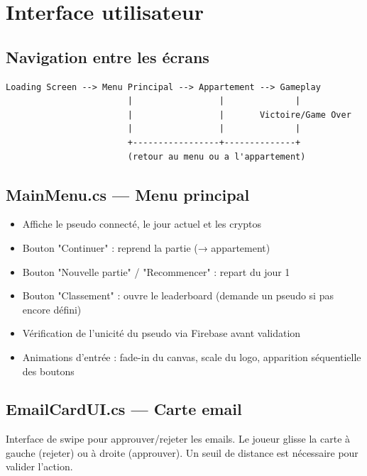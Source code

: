 \documentclass[12pt,a4paper]{article}
\begin{document}
\section{Interface utilisateur}

\subsection{Navigation entre les écrans}

\noindent
\begin{minipage}{\textwidth}
\begin{verbatim}
Loading Screen --> Menu Principal --> Appartement --> Gameplay
                        |                 |              |
                        |                 |       Victoire/Game Over
                        |                 |              |
                        +-----------------+--------------+
                        (retour au menu ou a l'appartement)
\end{verbatim}
\end{minipage}

\subsection{MainMenu.cs — Menu principal}
\begin{itemize}
    \item Affiche le pseudo connecté, le jour actuel et les cryptos
    \item Bouton "Continuer" : reprend la partie (→ appartement)
    \item Bouton "Nouvelle partie" / "Recommencer" : repart du jour 1
    \item Bouton "Classement" : ouvre le leaderboard (demande un pseudo si pas encore défini)
    \item Vérification de l'unicité du pseudo via Firebase avant validation
    \item Animations d'entrée : fade-in du canvas, scale du logo, apparition séquentielle des boutons
\end{itemize}

\subsection{EmailCardUI.cs — Carte email}
Interface de swipe pour approuver/rejeter les emails. Le joueur glisse la carte à gauche (rejeter) ou à droite (approuver). Un seuil de distance est nécessaire pour valider l'action.
\end{document}
